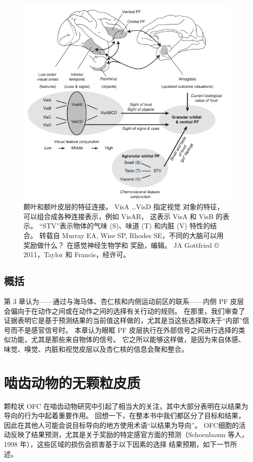 \begin{figure}[!htb]
	\centering
	\includegraphics{image_pfc/Fig_4_3}
	\caption{颞叶和额叶皮层的特征连接。 VisA …VisD 指定视觉
		对象的特征，可以组合成各种连接表示，例如 VisAB，
		这表示 VisA 和 VisB 的表示。 “STV”表示物体的气味 (S)、味道 (T) 和内脏 (V) 特性的结合。 转载自 Murray EA, Wise SP,
		Rhodes SE，不同的大脑可以用奖励做什么？ 在感觉神经生物学和
		奖励，编辑。 JA Gottfried © 2011，Taylor 和 Francis，经许可。}
\end{figure}

\subsection{概括}
第 3 章认为——通过与海马体、杏仁核和内侧运动前区的联系——内侧 PF 皮层会偏向于在动作之间或在动作之间的选择有关行动的规则。 在那里，我们审查了证据表明它是基于预测结果的当前值这样做的，尤其是当这些选择取决于“内部”信号而不是感官信号时。 本章认为眼眶 PF 皮层执行在外部信号之间进行选择的类似功能，尤其是那些来自物体的信号。 它之所以能够这样做，是因为来自体感、味觉、嗅觉、内脏和视觉皮层以及杏仁核的信息会聚和整合。
\section{啮齿动物的无颗粒皮质}
颗粒状 OFC 在啮齿动物研究中引起了相当大的关注，其中大部分表明在以结果为导向的行为中起着重要作用。 回想一下，在整本书中我们都区分了目标和结果，因此在其他人可能会说目标导向的地方使用术语“以结果为导向”。 OFC细胞的活动反映了结果预测，尤其是关于奖励的特定感官方面的预测（Schoenbaum 等人，1998 年），这些区域的损伤会损害基于以下因素的选择
结果预期，如下一节所述。
